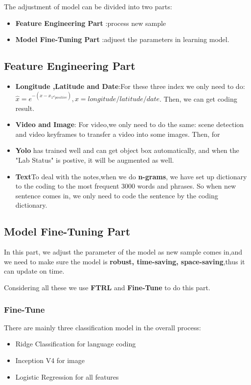 \documentclass[12pt]{article}
\begin{document}
The adjustment of model can be divided into two parts:
\begin{itemize}
	\item \textbf{Feature Engineering Part} :process new sample
	\item \textbf{Model Fine-Tuning Part} :adjuest the parameters in learning model.
\end{itemize}
\subsection{Feature Engineering Part}
\begin{itemize}
	\item \textbf{Longitude ,Latitude and Date}:For these three index we only need to do: $\hat{x}=e^{-(x-x_{1^{st}positive})},x=longitude/latitude/date$. Then, we can get coding result.
	\item \textbf{Video and Image}: For video,we only need to do the same: scene detection and video keyframes to transfer a video into some images. Then, for
	\item \textbf{Yolo} has trained well and can get object box automatically, and when the "Lab Status" is postive, it will be augmented as well.
	\item \textbf{Text}To deal with the notes,when we do \textbf{n-grams}, we have set up dictionary to the coding to the most frequent 3000 words and phrases. So when new sentence comes in, we only need to code the sentence by the coding dictionary.
\end{itemize}


\subsection{Model Fine-Tuning Part}
In this part, we adjust the parameter of the model as new sample comes in,and we need to make sure the model is \textbf{robust, time-saving, space-saving},thus it can update on time.

Considering all these we use \textbf{FTRL} and \textbf{Fine-Tune} to do this part.
 
\subsubsection{Fine-Tune}
There are mainly three classification model in the overall process:
\begin{itemize}
	\item Ridge Classification for language coding
	\item Inception V4 for image
	\item Logistic Regression for all features
\end{itemize}
\end{document}
